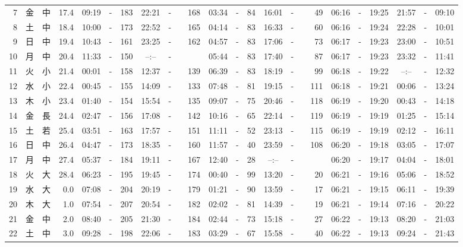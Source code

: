 \documentclass[12pt,a4j]{jsarticle}
\begin{document}
\begin{table}[htbp]
\begin{center}
{\begin{tabular}{|rc|cr|ccrccr|ccrccr|ccc|ccc|}
 7 & 金 & 中 & 17.4 &  09:19 &-& 183 &  22:21 &-& 168 &  03:34 &-&  84 &  16:01 &-&  49 & 06:16 & -& 19:25 & 21:57 & -& 09:10 \\
 8 & 土 & 中 & 18.4 &  10:00 &-& 173 &  22:52 &-& 165 &  04:14 &-&  83 &  16:33 &-&  60 & 06:16 & -& 19:24 & 22:28 & -& 10:01 \\
 9 & 日 & 中 & 19.4 &  10:43 &-& 161 &  23:25 &-& 162 &  04:57 &-&  83 &  17:06 &-&  73 & 06:17 & -& 19:23 & 23:00 & -& 10:51 \\
10 & 月 & 中 & 20.4 &  11:33 &-& 150 &  --:-- &-&~~~~~ &  05:44 &-&  83 &  17:40 &-&  87 & 06:17 & -& 19:23 & 23:32 & -& 11:41 \\
11 & 火 & 小 & 21.4 &  00:01 &-& 158 &  12:37 &-& 139 &  06:39 &-&  83 &  18:19 &-&  99 & 06:18 & -& 19:22 & --:-- & -& 12:32 \\
12 & 水 & 小 & 22.4 &  00:45 &-& 155 &  14:09 &-& 133 &  07:48 &-&  81 &  19:15 &-& 111 & 06:18 & -& 19:21 & 00:06 & -& 13:24 \\
13 & 木 & 小 & 23.4 &  01:40 &-& 154 &  15:54 &-& 135 &  09:07 &-&  75 &  20:46 &-& 118 & 06:19 & -& 19:20 & 00:43 & -& 14:18 \\
14 & 金 & 長 & 24.4 &  02:47 &-& 156 &  17:08 &-& 142 &  10:16 &-&  65 &  22:14 &-& 119 & 06:19 & -& 19:19 & 01:25 & -& 15:14 \\
15 & 土 & 若 & 25.4 &  03:51 &-& 163 &  17:57 &-& 151 &  11:11 &-&  52 &  23:13 &-& 115 & 06:19 & -& 19:19 & 02:12 & -& 16:11 \\
16 & 日 & 中 & 26.4 &  04:47 &-& 173 &  18:35 &-& 160 &  11:57 &-&  40 &  23:59 &-& 108 & 06:20 & -& 19:18 & 03:05 & -& 17:07 \\
17 & 月 & 中 & 27.4 &  05:37 &-& 184 &  19:11 &-& 167 &  12:40 &-&  28 &  --:-- &-&~~~~~ & 06:20 & -& 19:17 & 04:04 & -& 18:01 \\
18 & 火 & 大 & 28.4 &  06:23 &-& 195 &  19:45 &-& 174 &  00:40 &-&  99 &  13:20 &-&  20 & 06:21 & -& 19:16 & 05:06 & -& 18:52 \\
19 & 水 & 大 &  0.0 &  07:08 &-& 204 &  20:19 &-& 179 &  01:21 &-&  90 &  13:59 &-&  17 & 06:21 & -& 19:15 & 06:11 & -& 19:39 \\
20 & 木 & 大 &  1.0 &  07:54 &-& 207 &  20:54 &-& 182 &  02:02 &-&  81 &  14:39 &-&  19 & 06:21 & -& 19:14 & 07:16 & -& 20:22 \\
21 & 金 & 中 &  2.0 &  08:40 &-& 205 &  21:30 &-& 184 &  02:44 &-&  73 &  15:18 &-&  27 & 06:22 & -& 19:13 & 08:20 & -& 21:03 \\
22 & 土 & 中 &  3.0 &  09:28 &-& 198 &  22:06 &-& 183 &  03:29 &-&  67 &  15:58 &-&  40 & 06:22 & -& 19:13 & 09:24 & -& 21:43 \\

\end{tabular}}
\end{center}
\end{table}
\end{document}
